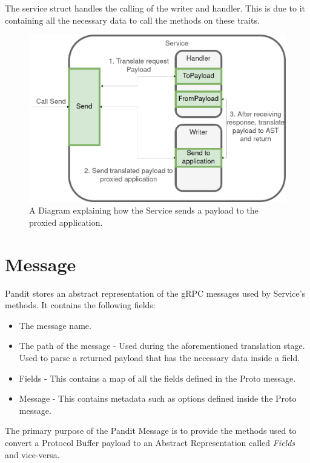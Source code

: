 \documentclass[a4paper,12pt]{report}
\begin{document}
The service struct handles the calling of the writer and handler. This is due to it containing all the necessary data to call the methods on these traits.

\begin{figure}[hbt!]
    \centering
    \includegraphics[width=\linewidth]{Service.png}
    \caption{A Diagram explaining how the Service sends a payload to the proxied application.}
    \label{fig:admin}
\end{figure}

\newpage

\section{Message}
\label{sec:messages}
Pandit stores an abstract representation of the gRPC messages used by Service's methods.
It contains the following fields:

\begin{itemize}
    \item The message name.
    \item The path of the message - Used during the aforementioned translation stage. Used to parse a returned payload that has the necessary data inside a field.
    \item Fields - This contains a map of all the fields defined in the Proto message.
    \item Message - This contains metadata such as options defined inside the Proto message.
\end{itemize}

The primary purpose of the Pandit Message is to provide the methods used to convert a Protocol Buffer payload to an Abstract Representation called \textit{Fields} and vice-versa.
\end{document}
